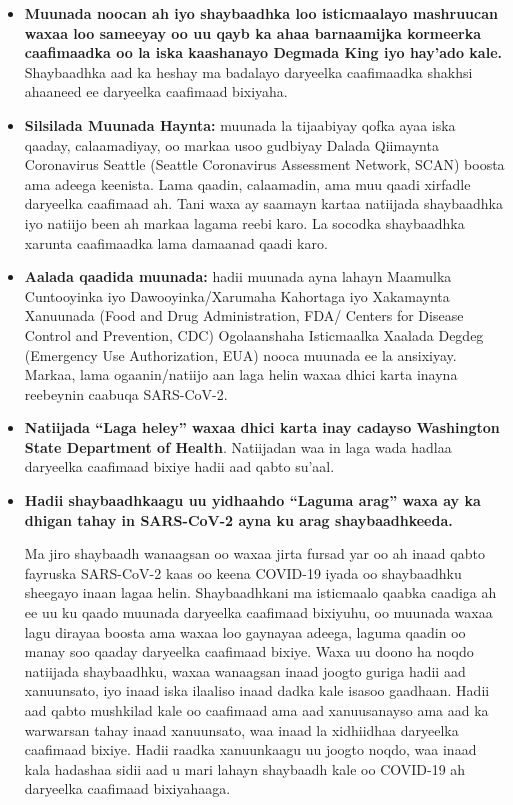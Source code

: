 \documentclass[10pt]{article}
\begin{document}
\begin{itemize}
\item

  \textbf{Muunada noocan ah iyo shaybaadhka loo isticmaalayo mashruucan waxaa
  loo sameeyay oo uu qayb ka ahaa barnaamijka kormeerka caafimaadka oo la iska
  kaashanayo Degmada King iyo hay'ado kale.} Shaybaadhka aad ka heshay ma
  badalayo daryeelka caafimaadka shakhsi ahaaneed ee daryeelka caafimaad
  bixiyaha.

\item

  \textbf{Silsilada Muunada Haynta:} muunada la tijaabiyay qofka ayaa iska
  qaaday, calaamadiyay, oo markaa usoo gudbiyay Dalada Qiimaynta Coronavirus
  Seattle (Seattle Coronavirus Assessment Network, SCAN) boosta ama adeega
  keenista. Lama qaadin, calaamadin, ama muu qaadi xirfadle daryeelka caafimaad
  ah. Tani waxa ay saamayn kartaa natiijada shaybaadhka iyo natiijo been ah
  markaa lagama reebi karo. La socodka shaybaadhka xarunta caafimaadka lama
  damaanad qaadi karo.

\item

  \textbf{Aalada qaadida muunada:} hadii muunada ayna lahayn Maamulka
  Cuntooyinka iyo Dawooyinka/Xarumaha Kahortaga iyo Xakamaynta Xanuunada (Food
  and Drug Administration, FDA/ Centers for Disease Control and Prevention, CDC)
  Ogolaanshaha Isticmaalka Xaalada Degdeg (Emergency Use Authorization, EUA)
  nooca muunada ee la ansixiyay. Markaa, lama ogaanin/natiijo aan laga helin
  waxaa dhici karta inayna reebeynin caabuqa SARS-CoV-2.

\item

  \textbf{Natiijada ``Laga heley'' waxaa dhici karta inay cadayso Washington
  State Department of Health}. Natiijadan waa in laga wada hadlaa daryeelka
  caafimaad bixiye hadii aad qabto su'aal.

\item{
  \textbf{Hadii shaybaadhkaagu uu yidhaahdo ``Laguma arag'' waxa ay ka dhigan
  tahay in SARS-CoV-2 ayna ku arag shaybaadhkeeda.}

Ma jiro shaybaadh wanaagsan oo waxaa jirta fursad yar oo ah inaad qabto fayruska
SARS-CoV-2 kaas oo keena COVID-19 iyada oo shaybaadhku sheegayo inaan lagaa
helin.  Shaybaadhkani ma isticmaalo qaabka caadiga ah ee uu ku qaado muunada
daryeelka caafimaad bixiyuhu, oo muunada waxaa lagu dirayaa boosta ama waxaa loo
gaynayaa adeega, laguma qaadin oo manay soo qaaday daryeelka caafimaad bixiye.
Waxa uu doono ha noqdo natiijada shaybaadhku, waxaa wanaagsan inaad joogto
guriga hadii aad xanuunsato, iyo inaad iska ilaaliso inaad dadka kale isasoo
gaadhaan. Hadii aad qabto mushkilad kale oo caafimaad ama aad xanuusanayso ama
aad ka warwarsan tahay inaad xanuunsato, waa inaad la xidhiidhaa daryeelka
caafimaad bixiye.  Hadii raadka xanuunkaagu uu joogto noqdo, waa inaad kala
hadashaa sidii aad u mari lahayn shaybaadh kale oo COVID-19 ah daryeelka
caafimaad bixiyahaaga.
}


\end{itemize}
\end{document}
